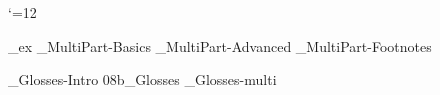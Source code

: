 



 \catcode`\@=12







%




_ex
_MultiPart-Basics
_MultiPart-Advanced
_MultiPart-Footnotes
%
%


\bye
{}_Glosses-Intro
\get 08b_Glosses
_Glosses-multi


